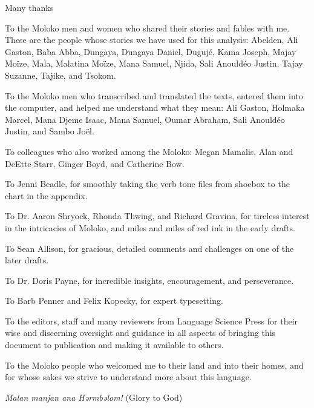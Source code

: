 Many thanks

To the Moloko men and women who shared their stories and fables with me.  These are the people whose stories we have used for this analysis: Abelden, Ali Gaston, Baba Abba, Dungaya, Dungaya Daniel, Dugujé, Kama Joseph, Majay Moïze, Mala, Malatina Moïze, Mana Samuel, Njida, Sali Anouldéo Justin, Tajay Suzanne, Tajike, and Tsokom.

To the Moloko men who transcribed and translated the texts, entered them into the computer, and helped me understand what they mean: Ali Gaston, Holmaka Marcel, Mana Djeme Isaac, Mana Samuel, Oumar Abraham, Sali Anouldéo Justin, and Sambo Joël.

To colleagues who also worked among the Moloko:  Megan Mamalis, Alan and DeEtte Starr, Ginger Boyd, and Catherine Bow.  

To Jenni Beadle, for smoothly taking the verb tone files from shoebox to the chart in the appendix.

To Dr. Aaron Shryock, Rhonda Thwing, and Richard Gravina, for tireless interest in the intricacies of Moloko, and miles and miles of red ink in the early drafts.

To Sean Allison, for gracious, detailed comments and challenges on one of the later drafts.

To Dr. Doris Payne, for incredible insights, encouragement, and perseverance. 

To Barb Penner and Felix Kopecky, for expert typesetting. 

To the editors, staff and many reviewers from Language Science Press for their wise and discerning oversight and guidance in all aspects of bringing this document to publication and making it available to others. 

To the Moloko people who welcomed me to their land and into their homes, and for whose sakes we strive to understand more about this language.  

\textit{Malan manjan ana Hərmbəlom!} (Glory to God)
